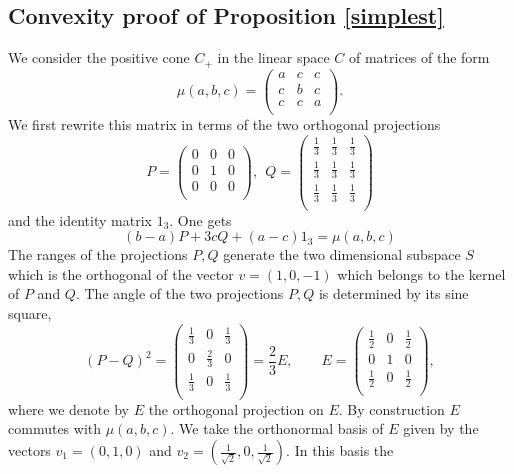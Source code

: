 \documentclass{amsart}
\begin{document}
 \subsection{Convexity proof of Proposition \ref{simplest}}
 We consider the positive cone $C_+$ in the linear space $C$ of matrices of the form 
 $$
 \mu(a,b,c)=\left(
\begin{array}{ccc}
 a & c & c \\
 c & b & c \\
 c & c & a \\
\end{array}
\right).
 $$
 We first rewrite this matrix in terms of the two orthogonal projections
 $$
P=\left(
\begin{array}{ccc}
 0 & 0 & 0 \\
 0 & 1 & 0 \\
 0 & 0 & 0 \\
\end{array}
\right), \ \  Q=\left(
\begin{array}{ccc}
 \frac{1}{3} & \frac{1}{3} & \frac{1}{3} \\
 \frac{1}{3} & \frac{1}{3} & \frac{1}{3} \\
 \frac{1}{3} & \frac{1}{3} & \frac{1}{3} \\
\end{array}
\right)
 $$
 and the identity matrix $1_3$. One gets 
 $$
 (b-a)P +3 c Q+(a-c)1_3=\mu(a,b,c)
 $$
 The ranges of the  projections $P,Q$ generate the two dimensional subspace $S$ which is the orthogonal of the vector $v=(1,0,-1)$ which belongs to the kernel of $P$ and $Q$.
 The angle of the two projections $P,Q$ is determined by its sine square, 
 $$
 (P-Q)^2=\left(
\begin{array}{ccc}
 \frac{1}{3} & 0 & \frac{1}{3} \\
 0 & \frac{2}{3} & 0 \\
 \frac{1}{3} & 0 & \frac{1}{3} \\
\end{array}
\right)=\frac 23 E, \qquad E=\left(
\begin{array}{ccc}
 \frac{1}{2} & 0 & \frac{1}{2} \\
 0 & 1 & 0 \\
 \frac{1}{2} & 0 & \frac{1}{2} \\
\end{array}
\right),
 $$
 where we denote by $E$ the orthogonal projection on $E$. By construction $E$ commutes with $\mu(a,b,c)$. We take the orthonormal basis of $E$ given by the vectors $v_1=(0,1,0)$ and $v_2=(\frac{1}{\sqrt{2}},0,\frac{1}{\sqrt{2}})$. In this basis the 
\end{document}
